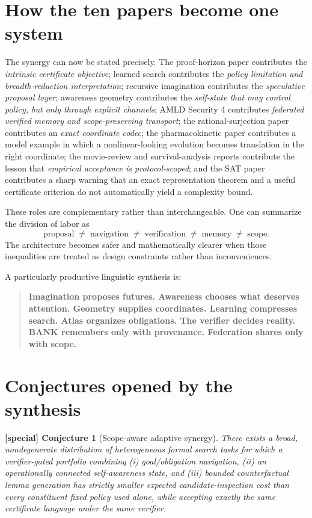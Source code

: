 \documentclass[11pt]{article}
\theoremstyle{special}
\newtheorem{specialconj}{[special] Conjecture}[section]
\theoremstyle{definition}
\begin{document}
\section{How the ten papers become one system}

The synergy can now be stated precisely. The proof-horizon paper contributes the \emph{intrinsic certificate objective}; learned search contributes the \emph{policy limitation and breadth-reduction interpretation}; recursive imagination contributes the \emph{speculative proposal layer}; awareness geometry contributes the \emph{self-state that may control policy, but only through explicit channels}; AMLD Security 4 contributes \emph{federated verified memory and scope-preserving transport}; the rational-surjection paper contributes an \emph{exact coordinate codec}; the pharmacokinetic paper contributes a model example in which a nonlinear-looking evolution becomes translation in the right coordinate; the movie-review and survival-analysis reports contribute the lesson that \emph{empirical acceptance is protocol-scoped}; and the SAT paper contributes a sharp warning that an exact representation theorem and a useful certificate criterion do not automatically yield a complexity bound.

These roles are complementary rather than interchangeable. One can summarize the division of labor as
\[
\boxed{\text{proposal}\;\neq\;\text{navigation}\;\neq\;\text{verification}\;\neq\;\text{memory}\;\neq\;\text{scope}.}
\]
The architecture becomes safer and mathematically clearer when those inequalities are treated as design constraints rather than inconveniences.

A particularly productive linguistic synthesis is:
\begin{quote}
\textbf{Imagination proposes futures. Awareness chooses what deserves attention. Geometry supplies coordinates. Learning compresses search. Atlas organizes obligations. The verifier decides reality. BANK remembers only with provenance. Federation shares only with scope.}
\end{quote}

\section{Conjectures opened by the synthesis}

\begin{specialconj}[Scope-aware adaptive synergy]
There exists a broad, nondegenerate distribution of heterogeneous formal search tasks for which a verifier-gated portfolio combining (i) goal/obligation navigation, (ii) an operationally connected self-awareness state, and (iii) bounded counterfactual lemma generation has strictly smaller expected candidate-inspection cost than every constituent fixed policy used alone, while accepting exactly the same certificate language under the same verifier.
\end{specialconj}
\end{document}
